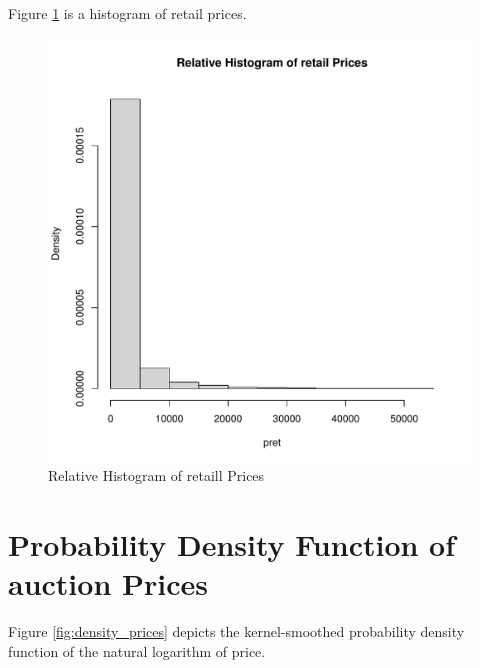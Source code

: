 \documentclass[11pt]{book}
\begin{document}
Figure \ref{fig:hist_prices} is 
a histogram of retail prices. 

\begin{figure}[h!]
  \centering
  \includegraphics[scale = 0.5, keepaspectratio=true]{../Figures/hist_prices}
  \caption{Relative Histogram of retaill Prices} \label{fig:hist_prices}
\end{figure}


\pagebreak
\section*{Probability Density Function of auction Prices}

Figure \ref{fig:density_prices} depicts 
the kernel-smoothed probability density function of the natural logarithm of
price.
\end{document}
